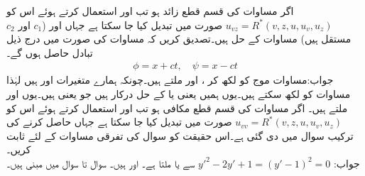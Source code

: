 \quad
اگر مساوات  کی قسم قطع زائد ہو تب   اور  استعمال کرتے ہوئے اس کو
$u_{vz}=R^*(v,z,u,u_v,u_z)$
صورت میں تبدیل کیا جا سکتا ہے جہاں  اور  ($c_1$ اور $c_2$ مستقل ہیں) مساوات  کے حل  ہیں۔تصدیق کریں کہ مساوات   کی صورت میں درج ذیل تبادل حاصل ہوں گے۔
\begin{align*}
\phi=x+ct,\quad \psi=x-ct
\end{align*}
جواب:\quad مساوات موج کو  لکھ کر ،  اور  ملتے ہیں۔چونکہ ہمارے متغیرات  اور  ہیں لہٰذا  مساوات  کو  لکھ سکتے ہیں۔یوں ہمیں  یعنی  یا  کے حل درکار ہیں جو  یعنی  ہیں۔یوں  اور  ملتے ہیں۔
\quad
اگر مساوات  کی قسم قطع مکافی ہو تب   اور  استعمال کرتے ہوئے اس کو
$u_{vv}=R^*(v,z,u,u_v,u_z)$
صورت میں تبدیل کیا جا سکتا ہے جہاں  حاصل کرنے کی ترکیب سوال  میں دی گئی ہے۔اس حقیقت کو سوال  کی تفرقی مساوات کے لئے ثابت کریں۔\\
جواب:\quad
$y'^2-2y'+1=(y'-1)^2=0$
سے  یا  ملتا ہے۔  اور  ہیں۔ 
سوال  تا سوال   میں مبنی ہیں۔


